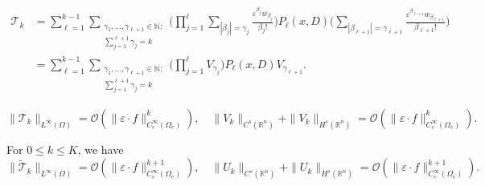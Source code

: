\documentclass[10pt,a4paper]{amsart}
\newcommand{\R}{\mathbb{R}}
\begin{document}
\begin{equation}\label{eq_T_k}
\begin{aligned}
\mathcal T_{k} 
& =
\sum^{k-1}_{\ell=1} \sum_{\substack{ \gamma_1,\ldots, \gamma_{\ell+1}\in \mathbb{N} : \\ \sum_{j=1}^{\ell+1}\gamma_j = k }}  \bigg( \prod_{j=1}^\ell\sum_{|\beta_j|=\gamma_j}  \frac{\varepsilon^{\beta_j} w_{\beta_j }}{\beta_j!} \bigg)    P_\ell(x,D)\bigg( \sum_{|\beta_{\ell+1}|=\gamma_{\ell+1}}\frac{\varepsilon^{\beta_{\ell+1}}w_{\beta_{\ell+1}}}{\beta_{\ell+1}!}\bigg) \\
& = \sum^{k-1}_{\ell=1} \sum_{\substack{ \gamma_1,\ldots, \gamma_{\ell+1}\in \mathbb{N} : \\ \sum_{j=1}^{\ell+1}\gamma_j = k }}  \bigg( \prod_{j=1}^\ell V_{\gamma_j} \bigg)    P_\ell(x,D)V_{\gamma_{\ell+1}}.
\end{aligned}
\end{equation}

\begin{equation}\label{eq_est_V&T}
\|\mathcal{T}_k\|_{L^\infty(\Omega)} = \mathcal{O}(\|\varepsilon\cdot f\|^k_{C_c^\infty(\Omega_e)}),\quad
\|V_k\|_{C^s(\R^n)}+\|V_k\|_{H^s(\R^n)}
= \mathcal{O}(\|\varepsilon\cdot f\|^k_{C_c^\infty(\Omega_e)}).
\end{equation}

\begin{lemma}\label{prop_est_U&Tilde T}
For $0\le k\le K$, we have
\begin{equation}\label{eq_est_U&Tilde T}
\|\widetilde{\mathcal{T}}_k\|_{L^\infty(\Omega)} = \mathcal{O}(\|\varepsilon\cdot f\|^{k+1}_{C_c^\infty(\Omega_e)}),\quad
\|U_k\|_{C^s(\R^n)}+ \|U_k\|_{H^s(\R^n)}= \mathcal{O}(\|\varepsilon\cdot f\|^{k+1}_{C_c^\infty(\Omega_e)}).
\end{equation}
\end{lemma}
\end{document}
